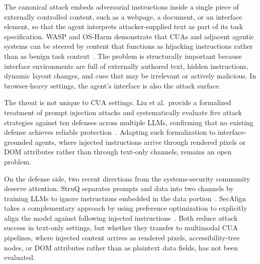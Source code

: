 The canonical attack embeds adversarial instructions inside a single piece of externally controlled content, such as a webpage, a document, or an interface element, so that the agent interprets attacker-supplied text as part of its task specification. WASP and OS-Harm demonstrate that CUAs and adjacent agentic systems can be steered by content that functions as hijacking instructions rather than as benign task context~\cite{wasp2025,osharm2025}. The problem is structurally important because interface environments are full of externally authored text, hidden instructions, dynamic layout changes, and cues that may be irrelevant or actively malicious. In browser-heavy settings, the agent's interface is also the attack surface.

The threat is not unique to CUA settings. Liu et al.\ provide a formalized treatment of prompt injection attacks and systematically evaluate five attack strategies against ten defenses across multiple LLMs, confirming that no existing defense achieves reliable protection~\cite{liuyupei2024formalizing}. Adapting such formalization to interface-grounded agents, where injected instructions arrive through rendered pixels or DOM attributes rather than through text-only channels, remains an open problem.

On the defense side, two recent directions from the systems-security community deserve attention. StruQ separates prompts and data into two channels by training LLMs to ignore instructions embedded in the data portion~\cite{struq2025}. SecAlign takes a complementary approach by using preference optimization to explicitly align the model against following injected instructions~\cite{secalign2025}. Both reduce attack success in text-only settings, but whether they transfer to multimodal CUA pipelines, where injected content arrives as rendered pixels, accessibility-tree nodes, or DOM attributes rather than as plaintext data fields, has not been evaluated.

